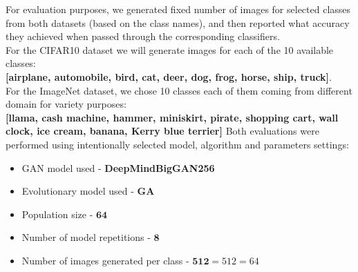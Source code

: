 \documentclass[11pt,a4paper,openany]{book}
\begin{document}
\noindent For evaluation purposes, we generated fixed number of images for selected classes from both datasets (based on the class names), and then reported what accuracy they achieved when passed through the corresponding classifiers. \\
\noindent For the CIFAR10 dataset we will generate images for each of the 10 available classes: \\
\noindent \textbf{[airplane, automobile, bird, cat, deer, dog, frog, horse, ship, truck]}.\\
For the ImageNet dataset, we chose 10 classes each of them coming from different domain for variety purposes: \\
\noindent \textbf{[llama,  cash machine,  hammer,  miniskirt,  pirate,  shopping cart,  wall clock,  ice cream,  banana, Kerry blue terrier]} 
\newline
Both evaluations were performed using intentionally selected model, algorithm and parameters settings:
\begin{itemize}
\item GAN model used - \textbf{DeepMindBigGAN256}
\item Evolutionary model used - \textbf{GA}
\item Population size - $\bm{64}$
\item Number of model repetitions - $\bm{8}$
\item Number of images generated per class - $\bm{512} = 512 = 64$
\end{itemize}
\end{document}
